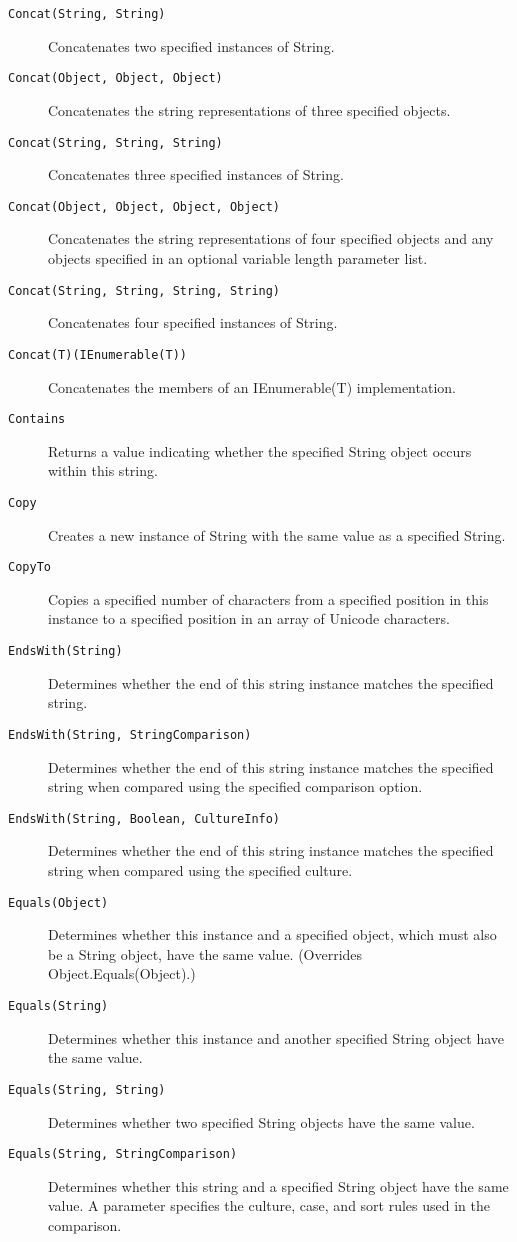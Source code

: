 \begin{description}
\item[\texttt{Concat(String, String)}] Concatenates two specified instances of String.
\item[\texttt{Concat(Object, Object, Object)}] Concatenates the string representations of three specified objects.
\item[\texttt{Concat(String, String, String)}] Concatenates three specified instances of String.
\item[\texttt{Concat(Object, Object, Object, Object)}] Concatenates the string representations of four specified objects and any objects specified in an optional variable length parameter list.
\item[\texttt{Concat(String, String, String, String)}] Concatenates four specified instances of String.
\item[\texttt{Concat(T)(IEnumerable(T))}] Concatenates the members of an IEnumerable(T) implementation.
\item[\texttt{Contains}] Returns a value indicating whether the specified String object occurs within this string.
\item[\texttt{Copy}] Creates a new instance of String with the same value as a specified String.
\item[\texttt{CopyTo}] Copies a specified number of characters from a specified position in this instance to a specified position in an array of Unicode characters.
\item[\texttt{EndsWith(String)}] Determines whether the end of this string instance matches the specified string.
\item[\texttt{EndsWith(String, StringComparison)}] Determines whether the end of this string instance matches the specified string when compared using the specified comparison option.
\item[\texttt{EndsWith(String, Boolean, CultureInfo)}] Determines whether the end of this string instance matches the specified string when compared using the specified culture.
\item[\texttt{Equals(Object)}] Determines whether this instance and a specified object, which must also be a String object, have the same value. (Overrides Object.Equals(Object).)
\item[\texttt{Equals(String)}] Determines whether this instance and another specified String object have the same value.
\item[\texttt{Equals(String, String)}] Determines whether two specified String objects have the same value.
\item[\texttt{Equals(String, StringComparison)}] Determines whether this string and a specified String object have the same value. A parameter specifies the culture, case, and sort rules used in the comparison.

\end{description}
